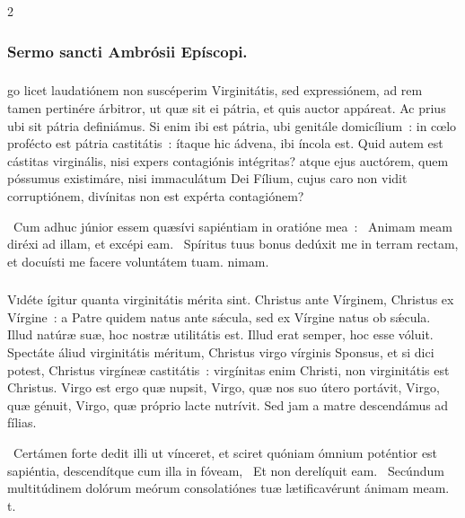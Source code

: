 \documentclass[9pt,twoside]{extarticle}
\begin{document}
\begin{multicols}{2}
{\subsubsection*{\center Sermo sancti Ambrósii Epíscopi.}
\subsubsection*{\center {}}
go licet laudatiónem non suscéperim Virginitátis, sed expressiónem, ad rem tamen pertinére árbitror, ut quæ sit ei pátria, et quis auctor appáreat. Ac prius ubi sit pátria definiámus. Si enim ibi est pátria, ubi genitále domicílium~: in cœlo profécto est pátria castitátis~: ítaque hic ádvena, ibi íncola est. Quid autem est cástitas virginális, nisi expers contagiónis intégritas? atque ejus auctórem, quem póssumus existimáre, nisi immaculátum Dei Fílium, cujus caro non vidit corruptiónem, divínitas non est expérta contagiónem?

\begin{tightlist}{}
\item {}~Cum adhuc júnior essem quæsívi sapiéntiam in oratióne mea~: \textred{*}~Animam meam diréxi ad illam, et excépi eam. ~Spíritus tuus bonus dedúxit me in terram rectam, et docuísti me facere voluntátem tuam. nimam.
\end{tightlist}

\subsubsection*{\center {}}
\lettrine{V}idéte ígitur quanta virginitátis mérita sint. Christus ante Vírginem, Christus ex Vírgine~: a Patre quidem natus ante sǽcula, sed ex Vírgine natus ob sǽcula. Illud natúræ suæ, hoc nostræ utilitátis est. Illud erat semper, hoc esse vóluit. Spectáte áliud virginitátis méritum, Christus virgo vírginis Sponsus, et si dici potest, Christus virgíneæ castitátis~: virgínitas enim Christi, non virginitátis est Christus. Virgo est ergo quæ nupsit, Virgo, quæ nos suo útero portávit, Virgo, quæ génuit, Virgo, quæ próprio lacte nutrívit. Sed jam a matre descendámus ad fílias.

\begin{tightlist}{}
\item {}~Certámen forte dedit illi ut vínceret, et sciret quóniam ómnium poténtior est sapiéntia, descendítque cum illa in fóveam, \textred{*}~Et non derelíquit eam. ~Secúndum multitúdinem dolórum meórum consolatiónes tuæ lætificavérunt ánimam meam. t.
\end{tightlist}

}
\end{multicols}
\end{document}
